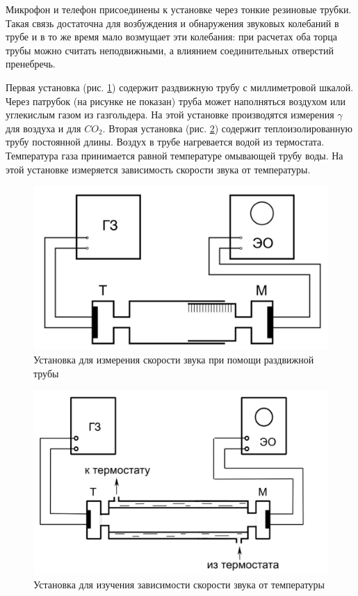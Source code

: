 \documentclass[a4paper, 12pt]{article}
\begin{document}
Микрофон и телефон присоединены к установке через тонкие резиновые трубки. Такая связь достаточна для возбуждения и обнаружения звуковых колебаний в трубе и в то же время мало возмущает эти колебания: при расчетах оба торца трубы можно считать неподвижными, а влиянием соединительных отверстий пренебречь.

Первая установка (рис. \ref{img1}) содержит раздвижную трубу с миллиметровой шкалой. Через патрубок (на рисунке не показан) труба может наполняться воздухом или углекислым газом из газгольдера. На этой установке производятся измерения $ \gamma $ для воздуха и для $ CO_2 $. Вторая установка (рис. \ref{img2}) содержит теплоизолированную трубу постоянной длины. Воздух в трубе нагревается водой из термостата. Температура газа принимается равной температуре омывающей трубу воды. На этой установке измеряется зависимость скорости звука от температуры.

\begin{figure}[H]
    \begin{center}
        \includegraphics[width=12cm]{ust1.jpg}
    \end{center}
    \caption{Установка для измерения скорости звука при помощи раздвижной трубы}
    \label{img1}
\end{figure}

\begin{figure}[H]
    \begin{center}
        \includegraphics[width=12cm]{ust2.jpg}
    \end{center}
    \caption{Установка для изучения зависимости скорости звука от температуры}
    \label{img2}
\end{figure}
\end{document}

